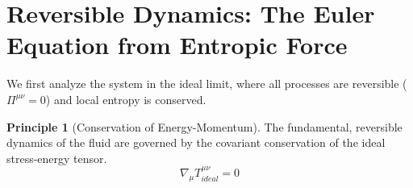 \documentclass[11pt, letterpaper]{report}
\theoremstyle{plain} %
\theoremstyle{definition} %
\newtheorem{principle}{Principle}[chapter]
\theoremstyle{remark} %
\begin{document}
\section{Reversible Dynamics: The Euler Equation from Entropic Force}
\label{sec:hydro_euler}

We first analyze the system in the ideal limit, where all processes are reversible ($\Pi^{\mu\nu}=0$) and local entropy is conserved.

\begin{principle}[Conservation of Energy-Momentum]
The fundamental, reversible dynamics of the fluid are governed by the covariant conservation of the ideal stress-energy tensor.
\begin{equation}
    \nabla_\mu T^{\mu\nu}_{ideal} = 0
\end{equation}
\end{principle}
\end{document}

